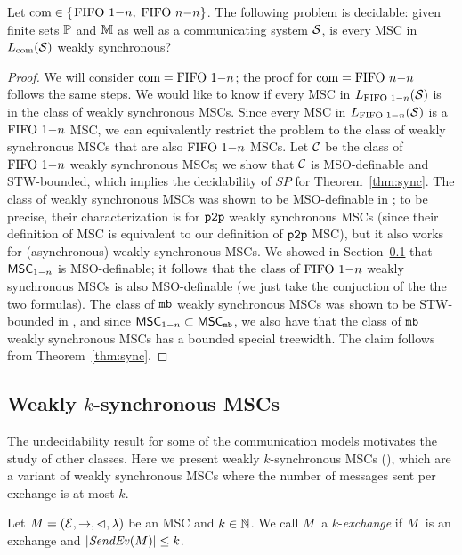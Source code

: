 \begin{proposition}\label{thm:weak-sync}
	Let $\textup{com} \in \{$$\text{FIFO } 1\mathsf{-}n, $ $\text{FIFO } n\mathsf{-}n\}$.
	The following problem is decidable:
	given finite sets $\mathbb{P}$ and $\mathbb{M}$ as well as a communicating system $\mathcal{S}$,
	is every MSC in $L_{\textup{com}}(\mathcal{S})$ weakly synchronous?
\end{proposition}
\begin{proof}
	We will consider $\textup{com} = \text{FIFO } 1\mathsf{-}n$; the proof for $\textup{com} = \text{FIFO } n\mathsf{-}n$ follows the same steps. We would like to know if every MSC in $L_{\text{FIFO } 1\mathsf{-}n}(\mathcal{S})$ is in the class of weakly synchronous MSCs. Since every MSC in $L_{\text{FIFO } 1\mathsf{-}n}(\mathcal{S})$ is a $\text{FIFO } 1\mathsf{-}n$ MSC, we can equivalently restrict the problem to the class of weakly synchronous MSCs that are also $\text{FIFO } 1\mathsf{-}n$ MSCs. Let $\mathcal{C}$ be the class of $\text{FIFO } 1\mathsf{-}n$ weakly synchronous MSCs; we show that $\mathcal{C}$ is MSO-definable and STW-bounded, which implies the decidability of $SP$ for Theorem~\ref{thm:sync}. The class of weakly synchronous MSCs was shown to be MSO-definable in \cite{BolligFG21}; to be precise, their characterization is for $\mathtt{p2p}$ weakly synchronous MSCs (since their definition of MSC is equivalent to our definition of $\mathtt{p2p}$ MSC), but it also works for (asynchronous) weakly synchronous MSCs. We showed in Section~\ref{} that $\mathsf{MSC}_{1\mathsf{-}n}$ is MSO-definable; it follows that the class of $\text{FIFO } 1\mathsf{-}n$ weakly synchronous MSCs is also MSO-definable (we just take the conjuction of the the two formulas). The class of $\mathtt{mb}$ weakly synchronous MSCs was shown to be STW-bounded in \cite{BolligFG21}, and since $\mathsf{MSC}_{1\mathsf{-}n} \subset \mathsf{MSC}_{\mathtt{mb}}$, we also have that the class of $\mathtt{mb}$ weakly synchronous MSCs has a bounded special treewidth. The claim follows from Theorem~\ref{thm:sync}.
\end{proof}

\subsection{Weakly \texorpdfstring{$k$}{k}-synchronous MSCs}

The undecidability result for some of the communication models motivates the study of other classes. Here we present weakly $k$-synchronous MSCs (\cite{BolligFG21}), which are a variant of weakly synchronous MSCs where the number of messages sent per exchange is at most $k$.

\begin{definition}[$k$-exchange]\label{def:weak-k-synchr}
Let $M = (\mathcal{E},\to,\lhd,\lambda)$ be an MSC
and $k \in \mathbb{N}$.
We call $M$ a $k$-\emph{exchange} if
$M$ is an exchange and $|\mathit{SendEv}(M)| \le k$.
\end{definition}

